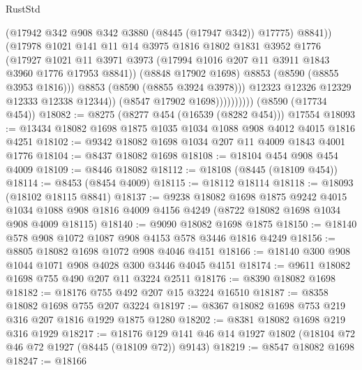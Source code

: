 \begin{lexlean}{RustStd}
\begin{coremodule}
                                (@17942 @342 @908 @342 @3880 (@8445 (@17947 @342)) @17775)
                                @8841))
                            (@17978
                              @1021
                              @141
                              @11
                              @14
                              @3975
                              @1816
                              @1802
                              @1831
                              @3952
                              @1776
                              (@17927
                                @1021
                                @11
                                @3971
                                @3973
                                (@17994 @1016 @207 @11 @3911 @1843 @3960 @1776 @17953 @8841))
                              (@8848 @17902 @1698)
                              @8853
                              (@8590 (@8855 @3953 @1816)))
                            @8853
                            (@8590 (@8855 @3924 @3978)))
                          @12323
                          @12326
                          @12329
                          @12333
                          @12338
                          @12344))
                      (@8547 @17902 @1698))))))))))
    (@8590 (@17734 @454))
@18082 := @8275 (@8277 @454 (@16539 (@8282 @454))) @17554
@18093 := @13434 @18082 @1698 @1875 @1035 @1034 @1088 @908 @4012 @4015 @1816 @4251
@18102 := @9342 @18082 @1698 @1034 @207 @11 @4009 @1843 @4001 @1776
@18104 := @8437 @18082 @1698
@18108 := @18104 @454 @908 @454 @4009
@18109 := @8446 @18082
@18112 := @18108 (@8445 (@18109 @454))
@18114 := @8453 (@8454 @4009)
@18115 := @18112 @18114
@18118 := @18093 (@18102 @18115 @8841)
@18137 := @9238
    @18082
    @1698
    @1875
    @9242
    @4015
    @1034
    @1088
    @908
    @1816
    @4009
    @4156
    @4249
    (@8722 @18082 @1698 @1034 @908 @4009 @18115)
@18140 := @9090 @18082 @1698 @1875
@18150 := @18140 @578 @908 @1072 @1087 @908 @4153 @578 @3446 @1816 @4249
@18156 := @8805 @18082 @1698 @1072 @908 @4046 @4151
@18166 := @18140 @300 @908 @1044 @1071 @908 @4028 @300 @3446 @4045 @4151
@18174 := @9611 @18082 @1698 @755 @490 @207 @11 @3224 @2511
@18176 := @8390 @18082 @1698
@18182 := @18176 @755 @492 @207 @15 @3224 @16510
@18187 := @8358 @18082 @1698 @755 @207 @3224
@18197 := @8367 @18082 @1698 @753 @219 @316 @207 @1816 @1929 @1875 @1280
@18202 := @8381 @18082 @1698 @219 @316 @1929
@18217 := @18176 @129 @141 @46 @14 @1927 @1802 (@18104 @72 @46 @72 @1927 (@8445 (@18109 @72)) @9143)
@18219 := @8547 @18082 @1698
@18247 := @18166

\end{coremodule}
\end{lexlean}
